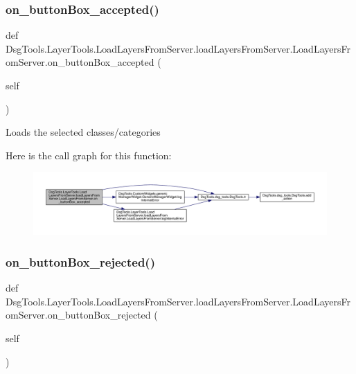 \subsubsection{\texorpdfstring{on\+\_\+button\+Box\+\_\+accepted()}{on\_buttonBox\_accepted()}}
{\footnotesize\ttfamily def Dsg\+Tools.\+Layer\+Tools.\+Load\+Layers\+From\+Server.\+load\+Layers\+From\+Server.\+Load\+Layers\+From\+Server.\+on\+\_\+button\+Box\+\_\+accepted (\begin{DoxyParamCaption}\item[{}]{self }\end{DoxyParamCaption})}

\begin{DoxyVerb}Loads the selected classes/categories
\end{DoxyVerb}
 Here is the call graph for this function\+:
\nopagebreak
\begin{figure}[H]
\begin{center}
\leavevmode
\includegraphics[width=350pt]{class_dsg_tools_1_1_layer_tools_1_1_load_layers_from_server_1_1load_layers_from_server_1_1_load_layers_from_server_ab6309a5f23be5931c1916c31ce8898ec_cgraph}
\end{center}
\end{figure}
\mbox{\label{class_dsg_tools_1_1_layer_tools_1_1_load_layers_from_server_1_1load_layers_from_server_1_1_load_layers_from_server_a54375e532c65753ec56787358a667cd7}} 
\subsubsection{\texorpdfstring{on\+\_\+button\+Box\+\_\+rejected()}{on\_buttonBox\_rejected()}}
{\footnotesize\ttfamily def Dsg\+Tools.\+Layer\+Tools.\+Load\+Layers\+From\+Server.\+load\+Layers\+From\+Server.\+Load\+Layers\+From\+Server.\+on\+\_\+button\+Box\+\_\+rejected (\begin{DoxyParamCaption}\item[{}]{self }\end{DoxyParamCaption})}

